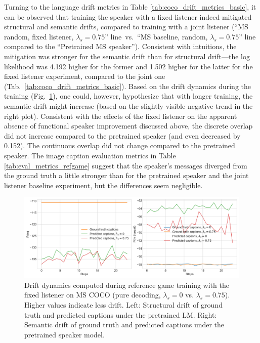 Turning to the language drift metrics in Table \ref{tab:coco_drift_metrics_basic}, it can be observed that training the speaker with a fixed listener indeed mitigated structural and semantic drifts, compared to training with a joint listener (``MS random, fixed listener, $\lambda_s=0.75$'' line~vs.~``MS baseline, random, $\lambda_s=0.75$'' line compared to the ``Pretrained MS speaker''). Consistent with intuitions, the mitigation was stronger for the semantic drift than for structural drift---the log likelihood was 4.192 higher for the former and 1.502 higher for the latter for the fixed listener experiment, compared to the joint one (Tab.~\ref{tab:coco_drift_metrics_basic}). Based on the drift dynamics during the training (Fig.~\ref{fig:coco_fixed_listener_075_str_sem_drift}), one could, however, hypothesize that with longer training, the semantic drift might increase (based on the slightly visible negative trend in the right plot). Consistent with the effects of the fixed listener on the apparent absence of functional speaker improvement discussed above, the discrete overlap did not increase compared to the pretrained speaker (and even decreased by 0.152). The continuous overlap did not change compared to the pretrained speaker. The image caption evaluation metrics in Table \ref{tab:eval_metrics_refgame} suggest that the speaker's messages diverged from the ground truth a little stronger than for the pretrained speaker and the joint listener baseline experiment, but the differences seem negligible.
\begin{figure}[h]
	\centering
	\includegraphics[width=\linewidth]{images/coco_fixedListener_structural_semantic_drift_4000_pure_0_075_random.png}
	\caption{Drift dynamics computed during reference game training with the fixed listener on MS COCO (pure decoding, $\lambda_s=0$ vs. $\lambda_s=0.75$). Higher values indicate less drift. Left: Structural drift of ground truth and predicted captions under the pretrained LM. Right: Semantic drift of ground truth and predicted captions under the pretrained speaker model.}
	\label{fig:coco_fixed_listener_075_str_sem_drift}
\end{figure}


